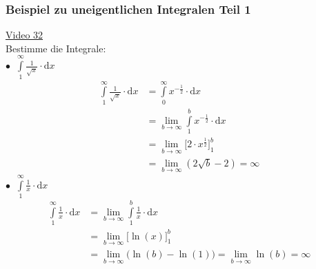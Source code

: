 \subsubsection{Beispiel zu uneigentlichen Integralen Teil 1}
\href{https://youtu.be/GQxkZxjBx88}{Video 32}\\
Bestimme die Integrale:\\
$ \bullet\;\; \int\limits_{1}^{\infty} \frac{1}{\sqrt{x}}\cdot \mathrm{d}x $\\
\begin{align*}
\int\limits_{1}^{\infty} \frac{1}{\sqrt{x}}\cdot \mathrm{d}x&=\int\limits_{0}^{\infty}x^{-\frac{1}{2}} \cdot \mathrm{d}x\\
&=\lim\limits_ {b\to \infty}\int\limits_{1}^{b} x^{-\frac{1}{2}}\cdot \mathrm{d}x\\
&=\lim\limits_ {b\to\infty}\bigg[2\cdot x^{\frac{1}{2}}\bigg]^b_1\\
&=\lim\limits_ {b\to\infty}(2\sqrt{b}-2)=\infty
\end{align*}
$ \bullet\;\; \int\limits_{1}^{\infty} \frac{1}{x}\cdot \mathrm{d}x $\\
\begin{align*}
\int\limits_{1}^{\infty} \frac{1}{x}\cdot \mathrm{d}x&=\lim\limits_ {b\to\infty}\int\limits_{1}^{b} \frac{1}{x}\cdot \mathrm{d}x\\
&=\lim\limits_ {b\to\infty}\bigg[\ln(x)\bigg]^b_1\\
&=\lim\limits_ {b\to\infty}\big(\ln(b)-\ln(1)\big)=\lim\limits_ {b\to\infty}\ln(b)=\infty
\end{align*}
